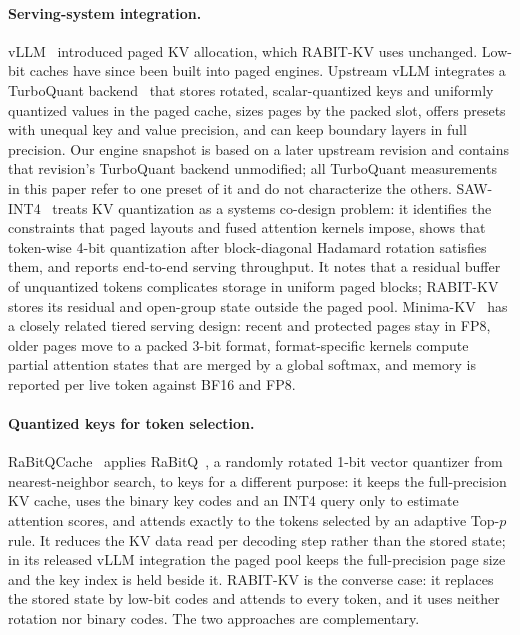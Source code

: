 \documentclass{article}
\begin{document}
\paragraph{Serving-system integration.}
vLLM~\citep{kwon2023vllm} introduced paged KV allocation, which RABIT-KV uses unchanged. Low-bit caches
have since been built into paged engines. Upstream vLLM integrates a TurboQuant backend~\citep{vllm2026turboquant}
that stores rotated, scalar-quantized keys and uniformly quantized values in the paged cache, sizes
pages by the packed slot, offers presets with unequal key and value precision, and can keep boundary
layers in full precision. Our engine snapshot is based on a later upstream revision and contains
that revision's TurboQuant backend unmodified; all TurboQuant measurements in this paper refer to one
preset of it and do not characterize the others.
SAW-INT4~\citep{jia2026sawint4} treats KV quantization as a systems co-design problem: it identifies the
constraints that paged layouts and fused attention kernels impose, shows that token-wise 4-bit
quantization after block-diagonal Hadamard rotation satisfies them, and reports end-to-end serving
throughput. It notes that a residual buffer of unquantized tokens complicates storage in uniform
paged blocks; RABIT-KV stores its residual and open-group state outside the paged pool.
Minima-KV~\citep{kozyrev2026minimakv} has a closely related tiered serving design: recent and protected
pages stay in FP8,
older pages move to a packed 3-bit format, format-specific kernels compute partial attention states
that are merged by a global softmax, and memory is reported per live token against BF16 and FP8.

\paragraph{Quantized keys for token selection.}
RaBitQCache~\citep{li2026rabitqcache} applies RaBitQ~\citep{gao2024rabitq}, a randomly rotated 1-bit
vector quantizer from nearest-neighbor search, to keys for a different purpose: it keeps the
full-precision KV cache, uses the binary key codes and an INT4 query only to estimate attention
scores, and attends exactly to the tokens selected by an adaptive Top-$p$ rule. It reduces the KV data
read per decoding step rather than the stored state; in its released vLLM integration the paged pool
keeps the full-precision page size and the key index is held beside it. RABIT-KV is the converse
case: it replaces the stored state by low-bit codes and attends to every token, and it uses neither
rotation nor binary codes. The two approaches are complementary.
\end{document}
